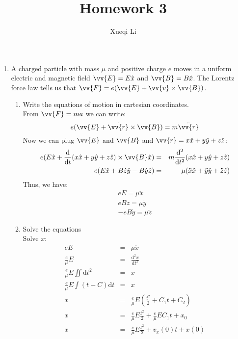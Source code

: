 \documentclass{article}
\newcommand{\de}{\mathrm{d}}
\begin{document}
\title{Homework 3}
\author{Xueqi Li}


\maketitle

\begin{enumerate}
    \item A charged particle with mass $\mu$ and positive charge $e$ moves in a uniform electric and magnetic field $\vv{E} = E \hat{x}$ and $\vv{B} = B \hat{x}$. The Lorentz force law tells us that $\vv{F} = e(\vv{E}+\vv{v}\times\vv{B})$.
    \begin{enumerate}
        \item Write the equations of motion in cartesian coordinates.\\

        From $\vv{F} = m a$ we can write:
        \[
        e(\vv{E}+\dot{\vv{r}}\times\vv{B}) = m \ddot{\vv{r}}
        \]
        Now we can plug $\vv{E}$ and $\vv{B}$ and $\vv{r} = x\hat{x} + y\hat{y} + z\hat{z}$:
        \begin{eqnarray*}
        e(E \hat{x}+\frac{\de}{\de t}(x\hat{x} + y\hat{y} + z\hat{z})\times\vv{B}\hat{x}) &=& m \frac{\de^2}{\de t^2} (x\hat{x} + y\hat{y} + z\hat{z}) \\
        e(E \hat{x} + B\dot{z}\hat{y}-B\dot{y} \hat{z} ) &=& \mu (\ddot{x}\hat{x} + \ddot{y}\hat{y} + \ddot{z}\hat{z}) \\
        \end{eqnarray*}
        Thus, we have:
        \begin{eqnarray*}
        eE = \mu \ddot{x} \\
        eB\dot{z} = \mu \ddot{y} \\
        -eB\dot{y} = \mu \ddot{z}
        \end{eqnarray*}
        \item Solve the equations\\

        Solve $x$: 
        \begin{eqnarray*}
        eE &=& \mu \ddot{x} \\
        \frac{e}{\mu}E &=& \frac{\de^2 x}{\de t^2} \\
        \frac{e}{\mu}E \iint \de t^2 &=& x \\
        \frac{e}{\mu}E \int (t + C)\de t &=& x \\
        x &=& \frac{e}{\mu}E (\frac{t^2}{2} + C_1t + C_2) \\
        x &=& \frac{e}{\mu}E \frac{t^2}{2} + \frac{e}{\mu}E C_1t + x_0 \\
        x &=& \frac{e}{\mu}E \frac{t^2}{2} + v_x(0)t + x(0)
        \end{eqnarray*}


\end{enumerate}
\end{enumerate}
\end{document}
